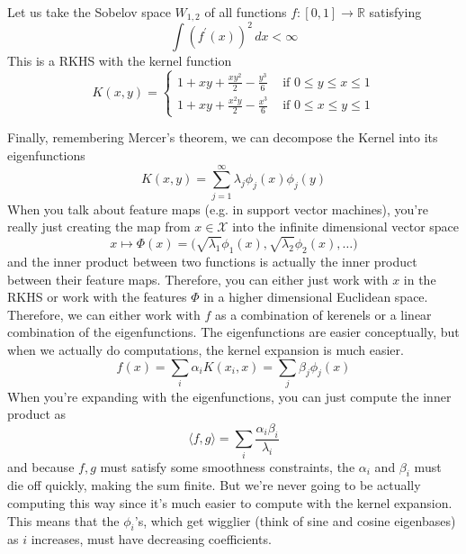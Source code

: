 \documentclass{article}
\begin{document}
    \begin{example}
      Let us take the Sobelov space $W_{1, 2}$ of all functions $f: [0, 1] \rightarrow \mathbb{R}$ satisfying 
      \begin{equation}
        \int (f^\prime (x))^2 \,dx < \infty
      \end{equation} 
      This is a RKHS with the kernel function 
      \begin{equation}
        K(x, y) = \begin{cases} 1 + xy + \frac{xy^2}{2} - \frac{y^3}{6} & \text{ if } 0 \leq y \leq x \leq 1 \\
          1 + xy + \frac{x^2 y}{2} - \frac{x^3}{6} & \text{ if } 0 \leq x \leq y \leq 1 \end{cases}
      \end{equation}
    \end{example}
  
    Finally, remembering Mercer's theorem, we can decompose the Kernel into its eigenfunctions 
    \begin{equation}
      K(x, y) = \sum_{j=1}^\infty \lambda_j \phi_j(x) \phi_j(y) 
    \end{equation}
    When you talk about feature maps (e.g. in support vector machines), you're really just creating the map from $x \in \mathcal{X}$ into the infinite dimensional vector space 
    \begin{equation}
      x \mapsto \Phi(x) = \big( \sqrt{\lambda_1} \phi_1(x), \sqrt{\lambda_2} \phi_2(x), \ldots \big)
    \end{equation}
    and the inner product between two functions is actually the inner product between their feature maps. Therefore, you can either just work with $x$ in the RKHS or work with the features $\Phi$ in a higher dimensional Euclidean space. Therefore, we can either work with $f$ as a combination of kerenels or a linear combination of the eigenfunctions. The eigenfunctions are easier conceptually, but when we actually do computations, the kernel expansion is much easier. 
    \begin{equation}
      f(x) = \sum_{i} \alpha_i K(x_i, x) = \sum_j \beta_j \phi_j(x) 
    \end{equation}
    When you're expanding with the eigenfunctions, you can just compute the inner product as 
    \begin{equation}
      \langle f, g \rangle = \sum_i \frac{\alpha_i \beta_i}{\lambda_i}
    \end{equation}
    and because $f, g$ must satisfy some smoothness constraints, the $\alpha_i$ and $\beta_i$ must die off quickly, making the sum finite. But we're never going to be actually computing this way since it's much easier to compute with the kernel expansion. This means that the $\phi_i$'s, which get wigglier (think of sine and cosine eigenbases) as $i$ increases, must have decreasing coefficients. 
\end{document}
